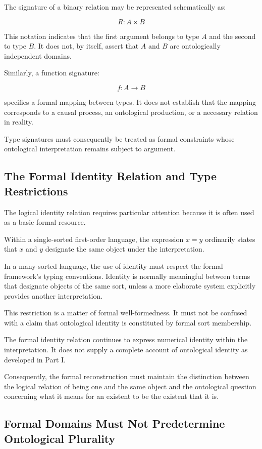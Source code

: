 The signature
of a binary
relation may
be represented
schematically as:

\[
R : A \times B
\]

This notation
indicates that
the first argument
belongs to type
\(A\) and the
second to type
\(B\). It does
not, by itself,
assert that \(A\)
and \(B\) are
ontologically
independent domains.

Similarly, a
function signature:

\[
f : A \rightarrow B
\]

specifies a
formal mapping
between types.
It does not
establish that
the mapping
corresponds to
a causal process,
an ontological
production, or
a necessary
relation in
reality.

Type signatures
must consequently
be treated as
formal constraints
whose ontological
interpretation
remains subject
to argument.

\subsection{The Formal Identity Relation and Type Restrictions}

The logical identity
relation requires
particular attention
because it is
often used as
a basic formal
resource.

Within a single-sorted
first-order language,
the expression
\(x=y\) ordinarily
states that \(x\)
and \(y\) designate
the same object
under the interpretation.

In a many-sorted
language, the
use of identity
must respect
the formal
framework's
typing conventions.
Identity is
normally meaningful
between terms
that designate
objects of the
same sort, unless
a more elaborate
system explicitly
provides another
interpretation.

This restriction
is a matter
of formal
well-formedness.
It must not
be confused
with a claim
that ontological
identity is
constituted by
formal sort
membership.

The formal
identity relation
continues to
express numerical
identity within
the interpretation.
It does not
supply a complete
account of
ontological identity
as developed
in Part I.

Consequently,
the formal
reconstruction
must maintain
the distinction
between the
logical relation
of being one
and the same
object and
the ontological
question concerning
what it means
for an existent
to be the
existent that
it is.

\subsection{Formal Domains Must Not Predetermine Ontological Plurality}

